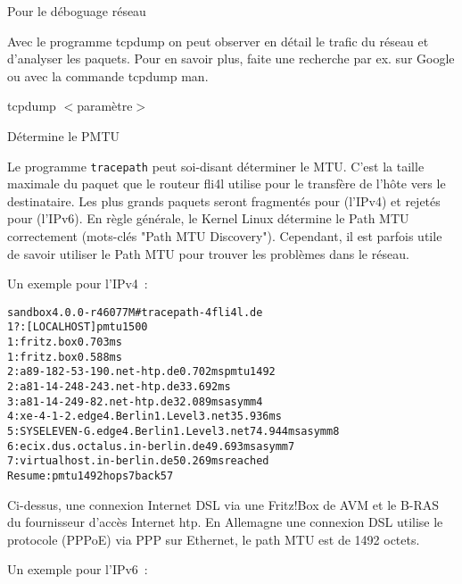 \begin{description}
 Pour le déboguage réseau

    Avec le programme tcpdump on peut observer en détail le trafic du réseau
    et d'analyser les paquets. Pour en savoir plus, faite une recherche
    par ex. sur Google ou avec la commande \flqq{}tcpdump man\frqq{}.

    tcpdump $<$paramètre$>$

 Détermine le PMTU

	Le programme \texttt{tracepath} peut soi-disant
	déterminer le MTU. C'est la taille maximale du paquet que le routeur fli4l utilise
	pour le transfère de l'hôte vers le destinataire. Les plus grands paquets seront
	fragmentés pour (l'IPv4) et rejetés pour (l'IPv6). En règle générale, le Kernel Linux
	détermine le Path MTU correctement (mots-clés "Path MTU Discovery"). Cependant, il est
	parfois utile de savoir utiliser le Path MTU pour trouver les problèmes dans le réseau.

	Un exemple pour l'IPv4~:

    \begin{example}
    \begin{alltt}
    sandbox 4.0.0-r46077M \# tracepath -4 fli4l.de
     1?: [LOCALHOST]                                         pmtu 1500
     1:  fritz.box                                             0.703ms 
     1:  fritz.box                                             0.588ms 
     2:  a89-182-53-190.net-htp.de                             0.702ms pmtu 1492
     2:  a81-14-248-243.net-htp.de                            33.692ms 
     3:  a81-14-249-82.net-htp.de                             32.089ms asymm  4 
     4:  xe-4-1-2.edge4.Berlin1.Level3.net                    35.936ms
     5:  SYSELEVEN-G.edge4.Berlin1.Level3.net                 74.944ms asymm  8
     6:  ecix.dus.octalus.in-berlin.de                        49.693ms asymm  7
     7:  virtualhost.in-berlin.de                             50.269ms reached
         Resume: pmtu 1492 hops 7 back 57
    \end{alltt}
    \end{example}

	Ci-dessus, une connexion Internet DSL via une Fritz!Box de AVM et le B-RAS du fournisseur
	d'accès Internet htp. En Allemagne une connexion DSL utilise le protocole (PPPoE) via PPP
	sur Ethernet, le path MTU est de 1492 octets.

	Un exemple pour l'IPv6~:


\end{description}
